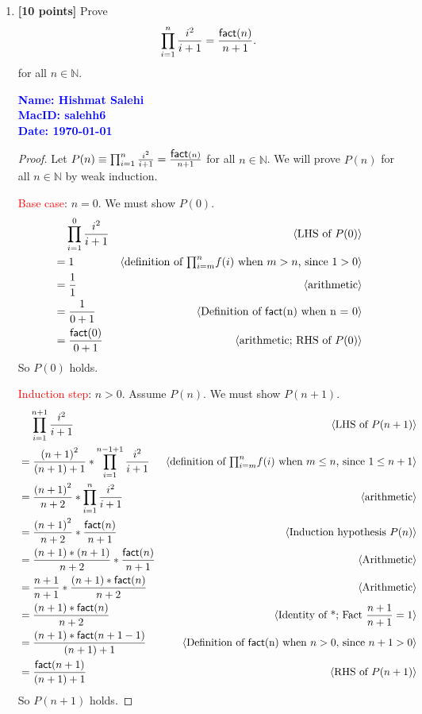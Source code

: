 \documentclass[11pt,fleqn]{article}
\newcommand{\mname}[1]{\mbox{\sf #1}}
\newcommand{\pnote}[1]{{\langle \text{#1} \rangle}}
\begin{document}
\begin{enumerate}

  \item \textbf{[10 points]} Prove \[\prod_{i = 1}^{n} \frac{i^2}{i +
    1} = \frac{\mname{fact}(n)}{n + 1}.\] for all $n \in \mathbb{N}$.

  \bigskip

  \textcolor{blue}{\textbf{Name: Hishmat Salehi \\ MacID: salehh6 \\ Date: \today}}

\begin{proof}
Let $P(n) \equiv \prod_{i = 1}^{n} \frac{i^2}{i +
    1} = \frac{\mname{fact}(n)}{n + 1}$ for all $n \in \mathbb{N}$.  We will prove $P(n)$
for all $n \in \mathbb{N}$ by weak induction.

\medskip

\textcolor{red}{Base case}: $n = 0$.  We must show $P(0)$.
\begin{align*}
  &\phantom{{}=} \prod_{i = 1}^{0} \frac{i^2}{i + 1} & \pnote{LHS of $P(0)$}\\
  &= 1          & \pnote{definition of $\textstyle{\prod}_{i=m}^{n} f(i)$ when $m > n$, since $1 > 0$}\\
  &= \frac{1}{1}  & \pnote{arithmetic}\\
  &= \frac{1}{0 + 1}      & \pnote{Definition of \mname{fact}(n) when n = 0}\\
  &= \frac{\mname{fact}(0)}{0 + 1}    & \pnote{arithmetic; RHS of $P(0)$}
\end{align*}
So $P(0)$ holds.

\medskip

\textcolor{red}{Induction step}: $n > 0$. Assume $P(n)$. We must show $P(n + 1)$.
\begin{align*}
  &\phantom{{}=} \prod_{i = 1}^{n+1} \frac{i^2}{i + 1}   & \pnote{LHS of $P(n + 1)$}\\
  &= \frac{{(n+1)}^2}{(n+1)+1}* \prod_{i = 1}^{n-1+1} \frac{i^2}{i + 1}  & \pnote{definition of $\textstyle{\prod}_{i=m}^{n} f(i)$ when $m \le n$, since $1 \le n+1$}\\
  &= \frac{{(n+1)}^2}{n+2}* \prod_{i = 1}^{n} \frac{i^2}{i + 1}  & \pnote{arithmetic}\\
  &= \frac{{(n+1)}^2}{n+2}* \frac{\mname{fact}(n)}{n + 1}  & \pnote{Induction hypothesis $P(n)$}\\
  &= \frac{(n+1)*(n+1)}{n+2}* \frac{\mname{fact}(n)}{n + 1}  & \pnote{Arithmetic}\\
  &= \frac{n+1}{n+1}* \frac{(n+1)*\mname{fact}(n)}{n + 2}  & \pnote{Arithmetic}\\
  &= \frac{(n+1)*\mname{fact}(n)}{n + 2}  & \pnote{Identity of *; Fact $\frac{n+1}{n+1} = 1$}\\
  &= \frac{(n+1)*\mname{fact}(n+1-1)}{(n+1)+1}  & \pnote{Definition of \mname{fact}(n) when $n > 0$, since $n + 1 > 0$}\\
  &= \frac{\mname{fact}(n+1)}{(n+1)+1}  & \pnote{RHS of $P(n + 1)$}\\
\end{align*}
So $P(n + 1)$ holds.


\end{proof}
\end{enumerate}
\end{document}
